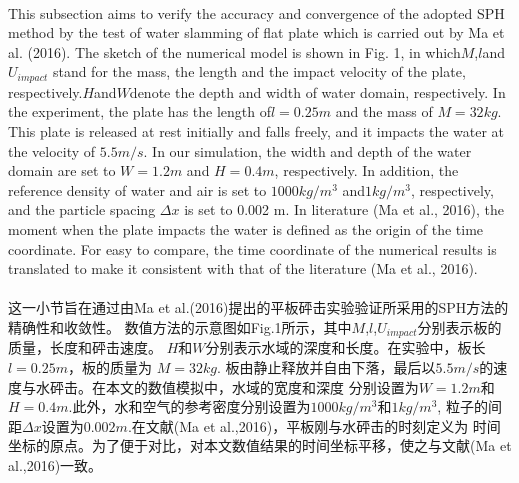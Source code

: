 \documentclass[UTF8]{ctexart}
\begin{document}
\paragraph{\quad}This subsection aims to verify the accuracy and convergence 
                of the adopted SPH method by the test of water slamming of 
                flat plate which is carried out by Ma et al. (2016). The sketch 
                of the numerical model is shown in Fig. 1, in which$ M$,$ l $and $U_{impact}$ 
                stand for the mass, the length and the impact velocity of the plate, 
                respectively.$ H $and$ W $denote the depth and width of water domain, 
                respectively. In the experiment, the plate has the length of$ l = 0.25 m$ 
                and the mass of $M = 32 kg$. This plate is released at rest initially and 
                falls freely, and it impacts the water at the velocity of $5.5 m/s$. In our 
                simulation, the width and depth of the water domain are set to $W = 1.2 m$ 
                and $H = 0.4 m$, respectively. In addition, the reference density of water 
                and air is set to $1000kg/m^3$ and$1kg/m^3$, respectively, and the particle 
                spacing $\Delta x$ is set to 0.002 m. In literature (Ma et al., 2016), the moment 
                when the plate impacts the water is defined as the origin of the time coordinate. 
                For easy to compare, the time coordinate of the numerical results is translated 
                to make it consistent with that of the literature (Ma et al., 2016).
\paragraph{\quad}这一小节旨在通过由Ma et al.(2016)提出的平板砰击实验验证所采用的SPH方法的精确性和收敛性。
                数值方法的示意图如Fig.1所示，其中$M$,$l$,$U_{impact}$分别表示板的质量，长度和砰击速度。
                $H$和$W$分别表示水域的深度和长度。在实验中，板长$ l = 0.25 m$，板的质量为 $M = 32 kg$.
                板由静止释放并自由下落，最后以$5.5m/s$的速度与水砰击。在本文的数值模拟中，水域的宽度和深度
                分别设置为$W=1.2m$和$H=0.4m$.此外，水和空气的参考密度分别设置为$1000kg/m^3$和$1kg/m^3$,
                粒子的间距$\Delta x$设置为$0.002m$.在文献(Ma et al.,2016)，平板刚与水砰击的时刻定义为
                时间坐标的原点。为了便于对比，对本文数值结果的时间坐标平移，使之与文献(Ma et al.,2016)一致。
\end{document}
